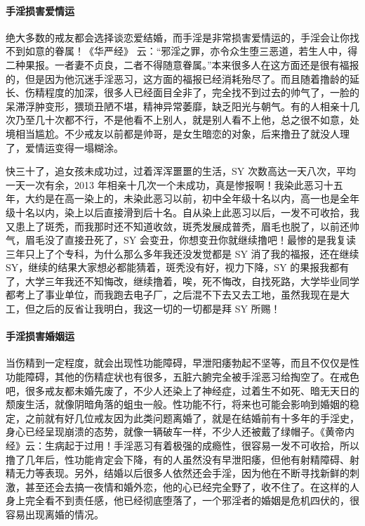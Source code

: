 \paragraph{手淫损害爱情运}

绝大多数的戒友都会选择谈恋爱结婚，而手淫是非常损害爱情运的，手淫会让你找不到如意的眷属！《华严经》 云：“邪淫之罪，亦令众生堕三恶道，若生人中，得二种果报。一者妻不贞良，二者不得随意眷属。”本来很多人在这方面还是很有福报的，但是因为他沉迷手淫恶习，这方面的福报已经消耗殆尽了。而且随着撸龄的延长、伤精程度的加深，很多人已经面目全非了，完全找不到过去的帅气了，一脸的呆滞浮肿变形，猥琐丑陋不堪，精神异常萎靡，缺乏阳光与朝气。有的人相亲十几次乃至几十次都不行，不是他看不上别人，就是别人看不上他，总之很不如意，处境相当尴尬。不少戒友以前都是帅哥，是女生暗恋的对象，后来撸丑了就没人理了，爱情运变得一塌糊涂。

\begin{case}[手淫损害爱情运]
    快三十了，追女孩未成功过，过着浑浑噩噩的生活，SY 次数高达一天八次，平均一天一次有余，2013 年相亲十几次一个未成功，真是惨报啊！我染此恶习十五年，大约是在高一染上的，未染此恶习以前，初中全年级十名以内，高一也是全年级十名以内，染上以后直接滑到后十名。自从染上此恶习以后，一发不可收拾，我又患上了斑秃，而我那时还不知道收敛，斑秃发展成普秃，眉毛也脱了，以前还帅气，眉毛没了直接丑死了，SY 会变丑，你想变丑你就继续撸吧！最惨的是我复读三年只上了个专科，为什么那么多年我还没发觉都是 SY 消了我的福报，还在继续 SY，继续的结果大家想必都能猜着，斑秃没有好，视力下降，SY 的果报我都有了，大学三年我还不知悔改，继续撸着，唉，死不悔改，自找死路，大学毕业同学都考上了事业单位，而我跑去电子厂，之后混不下去又去工地，虽然我现在是大工，但之后的反省让我明白，我这一切的一切都是拜 SY 所赐！
\end{case}

\paragraph{手淫损害婚姻运}

当伤精到一定程度，就会出现性功能障碍，早泄阳痿勃起不坚等，而且不仅仅是性功能障碍，其他的伤精症状也有很多，五脏六腑完全被手淫恶习给掏空了。在戒色吧，很多戒友都未婚先废了，不少人还染上了神经症，过着生不如死、暗无天日的颓废生活，就像阴暗角落的蛆虫一般。性功能不行，将来也可能会影响到婚姻的稳定，之前就有好几位戒友因为此类问题离婚了，就是在结婚前有十多年的手淫史，身心已经呈现崩溃的态势，就像一辆破车一样，不少人还被戴了绿帽子。《黄帝内经》云：生病起于过用！手淫恶习有着极强的成瘾性，很容易一发不可收拾，所以撸了几年后，性功能肯定会下降，有的人虽然没有早泄阳痿，但他有射精障碍、射精无力等表现。另外，结婚以后很多人依然还会手淫，因为他在不断寻找新鲜的刺激，甚至还会去搞一夜情和婚外恋，他的心已经完全野了，收不住了。在这样的人身上完全看不到责任感，他已经彻底堕落了，一个邪淫者的婚姻是危机四伏的，很容易出现离婚的情况。


